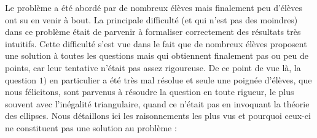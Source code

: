 Le problème a été abordé par de nombreux élèves mais finalement peu d'élèves ont su en venir à bout. La principale difficulté (et qui n'est pas des moindres) dans ce problème était de parvenir à formaliser correctement des résultats très intuitifs. Cette difficulté s'est vue dans le fait que de nombreux élèves proposent une solution à toutes les questions mais qui obtiennent finalement pas ou peu de points, car leur tentative n'était pas assez rigoureuse. 
\newline
De ce point de vue là, la question $1)$ en particulier a été très mal résolue et seule une poignée d'élèves, que nous félicitons, sont parvenus à résoudre la question en toute rigueur, le plus souvent avec l'inégalité triangulaire, quand ce n'était pas en invoquant la théorie des ellipses. Nous détaillons ici les raisonnements les plus vus et pourquoi ceux-ci ne constituent pas une solution au problème : 
